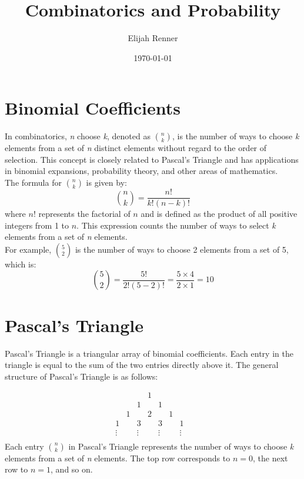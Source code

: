\documentclass[10pt]{article}
\title{Combinatorics and Probability}
\author{Elijah Renner}
\date{\today}
\theoremstyle{plain}
\theoremstyle{definition}
\theoremstyle{remark}
\begin{document}
\maketitle
\tableofcontents

\section{Binomial Coefficients}
 
In combinatorics, \textit{n} choose \textit{k}, denoted as \( \binom{n}{k} \), is the number of ways to choose \textit{k} elements from a set of \textit{n} distinct elements without regard to the order of selection. This concept is closely related to Pascal's Triangle and has applications in binomial expansions, probability theory, and other areas of mathematics.\\

The formula for \( n \choose k \) is given by:
\[
\binom{n}{k} = \frac{n!}{k!(n-k)!}
\]
where \( n! \) represents the factorial of \( n \) and is defined as the product of all positive integers from 1 to \( n \). This expression counts the number of ways to select \textit{k} elements from a set of \textit{n} elements.\\

For example, \( \binom{5}{2} \) is the number of ways to choose 2 elements from a set of 5, which is:
\[
\binom{5}{2} = \frac{5!}{2!(5-2)!} = \frac{5 \times 4}{2 \times 1} = 10
\]

\section{Pascal's Triangle}
Pascal's Triangle is a triangular array of binomial coefficients. Each entry in the triangle is equal to the sum of the two entries directly above it. The general structure of Pascal's Triangle is as follows:

\[
\begin{array}{cccccccc}
    &  &  & 1 &  &  &  &  \\
    &  & 1 &  & 1 &  &  &  \\
    & 1 &  & 2 &  & 1 &  &  \\
    1 &  & 3 &  & 3 &  & 1 &  \\
    \vdots & & \vdots &  & \vdots & & \vdots  \\
\end{array}
\]
Each entry \( \binom{n}{k} \) in Pascal's Triangle represents the number of ways to choose \textit{k} elements from a set of \textit{n} elements. The top row corresponds to \( n = 0 \), the next row to \( n = 1 \), and so on.
\end{document}
